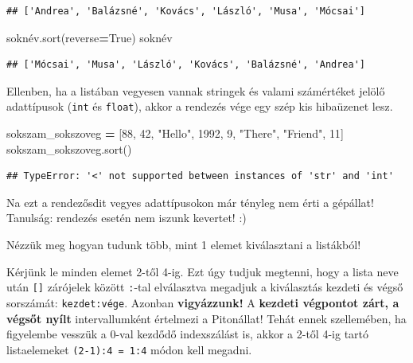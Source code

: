 \documentclass[
]{book}
\newenvironment{Shaded}{\begin{snugshade}}{\end{snugshade}}
\newcommand{\DecValTok}[1]{\textcolor[rgb]{0.00,0.00,0.81}{#1}}
\newcommand{\NormalTok}[1]{#1}
\newcommand{\OperatorTok}[1]{\textcolor[rgb]{0.81,0.36,0.00}{\textbf{#1}}}
\newcommand{\StringTok}[1]{\textcolor[rgb]{0.31,0.60,0.02}{#1}}
\newcommand{\VariableTok}[1]{\textcolor[rgb]{0.00,0.00,0.00}{#1}}
\begin{document}
\begin{verbatim}
## ['Andrea', 'Balázsné', 'Kovács', 'László', 'Musa', 'Mócsai']
\end{verbatim}

\begin{Shaded}
\begin{Highlighting}[]
\NormalTok{soknév.sort(reverse}\OperatorTok{=}\VariableTok{True}\NormalTok{)}
\NormalTok{soknév}
\end{Highlighting}
\end{Shaded}

\begin{verbatim}
## ['Mócsai', 'Musa', 'László', 'Kovács', 'Balázsné', 'Andrea']
\end{verbatim}

Ellenben, ha a listában vegyesen vannak stringek és valami számértéket jelölő adattípusok (\texttt{int} és \texttt{float}), akkor a rendezés vége egy szép kis hibaüzenet lesz.

\begin{Shaded}
\begin{Highlighting}[]
\NormalTok{sokszam\_sokszoveg }\OperatorTok{=}\NormalTok{ [}\DecValTok{88}\NormalTok{, }\DecValTok{42}\NormalTok{, }\StringTok{"Hello"}\NormalTok{, }\DecValTok{1992}\NormalTok{, }\DecValTok{9}\NormalTok{, }\StringTok{"There"}\NormalTok{, }\StringTok{"Friend"}\NormalTok{, }\DecValTok{11}\NormalTok{]}
\NormalTok{sokszam\_sokszoveg.sort()}
\end{Highlighting}
\end{Shaded}

\begin{verbatim}
## TypeError: '<' not supported between instances of 'str' and 'int'
\end{verbatim}

Na ezt a rendezősdit vegyes adattípusokon már tényleg nem érti a gépállat!
Tanulság: rendezés esetén nem iszunk kevertet! :)

Nézzük meg hogyan tudunk több, mint 1 elemet kiválasztani a listákból!

Kérjünk le minden elemet 2-től 4-ig. Ezt úgy tudjuk megtenni, hogy a lista neve után \texttt{{[}{]}} zárójelek között \texttt{:}-tal elválasztva megadjuk a kiválasztás kezdeti és végső sorszámát: \texttt{kezdet:vége}. Azonban \textbf{vigyázzunk!} A \textbf{kezdeti végpontot zárt, a végsőt nyílt} intervallumként értelmezi a Pitonállat! Tehát ennek szellemében, ha figyelembe vesszük a \(0\)-val kezdődő indexszálást is, akkor a 2-től 4-ig tartó listaelemeket \texttt{(2-1):4\ =\ 1:4} módon kell megadni.
\end{document}
